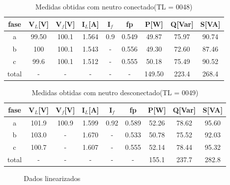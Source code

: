 \documentclass[a4paper, 12pt]{article}
\begin{document}
    \begin{table}[H]
         \centering
        \begin{tabular}{|c|c|c|c|c|c|c|c|c|}
              \hline %
                  fase & V\(_L\)[V] & V\(_f\)[V] & I\(_L\)[A] & I\(_f\) & fp & P[W] & Q[Var] & S[VA] \\
              \hline %
           a & 99.50 & 100.1 & 1.564 & 0.9 & 0.549 & 49.87 & 75.97 & 90.74     \\ 
              \hline %
           b & 100 & 100.1 & 1.543 & - & 0.556 & 49.30 & 72.60 & 87.46     \\ 
              \hline %
           c & 99.6 & 100.1 & 1.512 & - & 0.555 & 50.18 & 75.49 & 90.52     \\ 
              \hline %
           total & - & - & - & - & - & 149.50 & 223.4 & 268.4     \\ 
              \hline %
        \end{tabular}
        \caption{Medidas obtidas com neutro conectado(TL = 0048)}
    \end{table}
    \begin{table}[H]
         \centering
        \begin{tabular}{|c|c|c|c|c|c|c|c|c|}
              \hline %
                  fase & V\(_L\)[V] & V\(_f\)[V] & I\(_L\)[A] & I\(_f\) & fp & P[W] & Q[Var] & S[VA] \\
              \hline %
           a & 101.9 & 100.9 & 1.599 & 0.92 & 0.589 & 52.26 & 78.62 & 95.60     \\ 
              \hline %
           b & 103.0 & - & 1.670 & - & 0.533 & 50.78 & 75.52 & 92.03     \\ 
              \hline %
           c & 100.7 & - & 1.607 & - & 0.555 & 52.14 & 78.44 & 95.32     \\ 
              \hline %
           total & - & - & - & - & - & 155.1 & 237.7 & 282.8     \\ 
              \hline %
        \end{tabular}
        \caption{Medidas obtidas com neutro desconectado(TL = 0049)}
    \end{table}

        \begin{figure}[h]
            
            \centering %
            \caption{Dados linearizados}
            \label{figura:Dados linearizados}
        \end{figure} 
        
\end{document}
